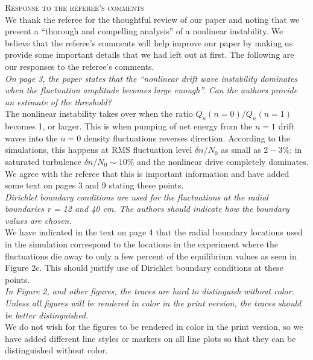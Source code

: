 \documentclass[12pt]{article}
\begin{document}
{\noindent \scshape Response to the referee's comments} \\ 

{\noindent We thank the referee for the thoughtful review of our paper and noting that we present a ``thorough and compelling analysis'' of a nonlinear instability. We believe that the referee's comments will help
improve our paper by making us provide some important details that we had left out at first. The following are our responses to the referee's comments. }\\

{\noindent \itshape  On page 3, the paper states that the “nonlinear drift wave instability dominates when
the fluctuation amplitude becomes large enough”. Can the authors provide an estimate of the threshold? }\\

{\noindent The nonlinear instability takes over when the ratio $Q_n(n=0)/Q_n(n=1)$ becomes 1, or larger. This is when pumping of net energy from the $n=1$ drift waves
into the $n=0$ density fluctuations reverses direction. According to the simulations, this happens at RMS fluctuation level $\delta n/N_0$ as small as $2-3\%$;
in saturated turbulence $\delta n/N_0 \sim 10 \%$ and the nonlinear drive completely dominates.
We agree with the referee that this is important information and have added some text on pages 3 and 9 stating these points. }\\

{\noindent \itshape    Dirichlet boundary conditions are used for the fluctuations at the radial boundaries r = 12 and 40 cm. The authors should indicate how the boundary values are chosen. }\\

{\noindent We have indicated in the text on page 4 that the radial boundary locations used in the simulation correspond to the locations in the experiment where the fluctuations die away to only
a few percent of the equilibrium values as seen in Figure 2c. This should justify use of Dirichlet boundary conditions at these points. }\\

{\noindent \itshape  In Figure 2, and other figures, the traces are hard to distinguish without color. Unless all figures will be rendered in color in the print version, the traces should be better
distinguished. }\\

{\noindent We do not wish for the figures to be rendered in color in the print version, so we have added different line styles or markers on all line plots so that they can be 
distinguished without color. }\\
\end{document}
